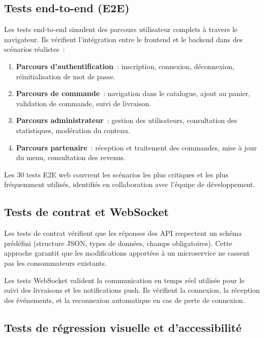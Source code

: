 \subsection{Tests end-to-end (E2E)}

Les tests end-to-end simulent des parcours utilisateur complets \`{a}
travers le navigateur. Ils v\'{e}rifient l'int\'{e}gration entre le frontend
et le backend dans des sc\'{e}narios r\'{e}alistes~:

\begin{enumerate}[leftmargin=*]
  \item \textbf{Parcours d'authentification}~: inscription, connexion,
    d\'{e}connexion, r\'{e}initialisation de mot de passe.
  \item \textbf{Parcours de commande}~: navigation dans le catalogue,
    ajout au panier, validation de commande, suivi de livraison.
  \item \textbf{Parcours administrateur}~: gestion des utilisateurs,
    consultation des statistiques, mod\'{e}ration du contenu.
  \item \textbf{Parcours partenaire}~: r\'{e}ception et traitement des
    commandes, mise \`{a} jour du menu, consultation des revenus.
\end{enumerate}

Les 30 tests E2E web couvrent les sc\'{e}narios les plus critiques et les
plus fr\'{e}quemment utilis\'{e}s, identifi\'{e}s en collaboration avec l'\'{e}quipe
de d\'{e}veloppement.

\subsection{Tests de contrat et WebSocket}

Les tests de contrat v\'{e}rifient que les r\'{e}ponses des API respectent un
sch\'{e}ma pr\'{e}d\'{e}fini (structure JSON, types de donn\'{e}es, champs obligatoires).
Cette approche garantit que les modifications apport\'{e}es \`{a} un microservice
ne cassent pas les consommateurs existants.

Les tests WebSocket valident la communication en temps r\'{e}el utilis\'{e}e
pour le suivi des livraisons et les notifications push. Ils v\'{e}rifient
la connexion, la r\'{e}ception des \'{e}v\'{e}nements, et la reconnexion
automatique en cas de perte de connexion.

\subsection{Tests de r\'{e}gression visuelle et d'accessibilit\'{e}}

